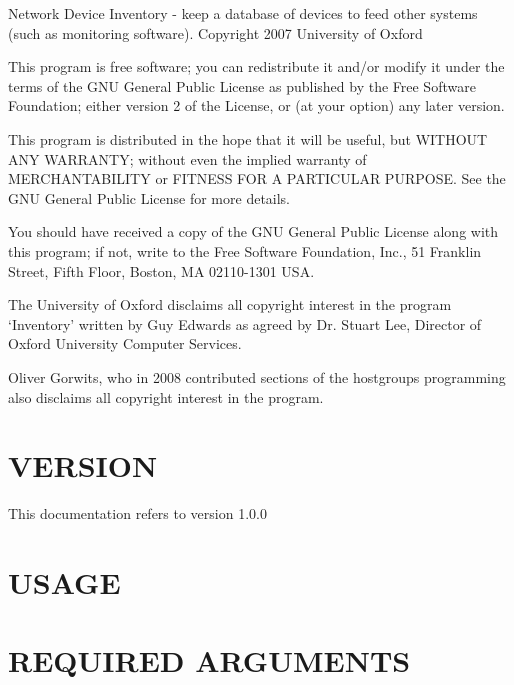 \documentclass{book}
\begin{document}
Network Device Inventory - keep a database of devices to feed other systems (such as monitoring software). Copyright 2007 University of Oxford



This program is free software; you can redistribute it and/or modify it under the terms of the GNU General Public License as published by the Free Software Foundation; either version 2 of the License, or (at your option) any later version.



This program is distributed in the hope that it will be useful, but WITHOUT ANY WARRANTY; without even the implied warranty of MERCHANTABILITY or FITNESS FOR A PARTICULAR PURPOSE. See the GNU General Public License for more details.



You should have received a copy of the GNU General Public License along with this program; if not, write to the Free Software Foundation, Inc., 51 Franklin Street, Fifth Floor, Boston, MA 02110-1301 USA.



The University of Oxford disclaims all copyright interest in the program `Inventory' written by Guy Edwards as agreed by Dr. Stuart Lee, Director of Oxford University Computer Services.



Oliver Gorwits, who in 2008 contributed sections of the hostgroups programming also disclaims all copyright interest in the program.




\section{VERSION}
\label{_VERSION}
\hypertarget{_VERSION}{}



This documentation refers to version 1.0.0


\section{USAGE}
\label{_USAGE}
\hypertarget{_USAGE}{}


\section{REQUIRED ARGUMENTS}
\label{_REQUIRED_ARGUMENTS}
\hypertarget{_REQUIRED_ARGUMENTS}{}
\end{document}
